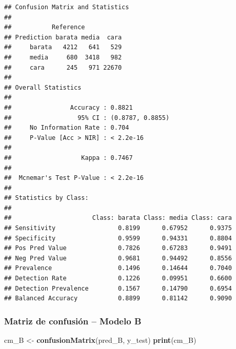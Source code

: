 \documentclass[
]{article}
\newenvironment{Shaded}{\begin{snugshade}}{\end{snugshade}}
\newcommand{\FunctionTok}[1]{\textcolor[rgb]{0.13,0.29,0.53}{\textbf{#1}}}
\newcommand{\NormalTok}[1]{#1}
\newcommand{\OtherTok}[1]{\textcolor[rgb]{0.56,0.35,0.01}{#1}}
\begin{document}
\begin{verbatim}
## Confusion Matrix and Statistics
## 
##           Reference
## Prediction barata media  cara
##     barata   4212   641   529
##     media     680  3418   982
##     cara      245   971 22670
## 
## Overall Statistics
##                                           
##                Accuracy : 0.8821          
##                  95% CI : (0.8787, 0.8855)
##     No Information Rate : 0.704           
##     P-Value [Acc > NIR] : < 2.2e-16       
##                                           
##                   Kappa : 0.7467          
##                                           
##  Mcnemar's Test P-Value : < 2.2e-16       
## 
## Statistics by Class:
## 
##                      Class: barata Class: media Class: cara
## Sensitivity                 0.8199      0.67952      0.9375
## Specificity                 0.9599      0.94331      0.8804
## Pos Pred Value              0.7826      0.67283      0.9491
## Neg Pred Value              0.9681      0.94492      0.8556
## Prevalence                  0.1496      0.14644      0.7040
## Detection Rate              0.1226      0.09951      0.6600
## Detection Prevalence        0.1567      0.14790      0.6954
## Balanced Accuracy           0.8899      0.81142      0.9090
\end{verbatim}

\hypertarget{matriz-de-confusiuxf3n-modelo-b}{%
\subsubsection{Matriz de confusión -- Modelo
B}\label{matriz-de-confusiuxf3n-modelo-b}}

\begin{Shaded}
\begin{Highlighting}[]
\NormalTok{cm\_B }\OtherTok{\textless{}{-}} \FunctionTok{confusionMatrix}\NormalTok{(pred\_B, y\_test)}
\FunctionTok{print}\NormalTok{(cm\_B)}
\end{Highlighting}
\end{Shaded}
\end{document}
